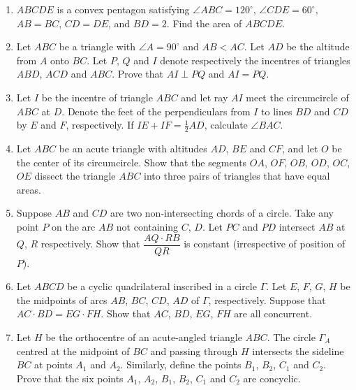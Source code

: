 \documentclass[12pt]{scrartcl}
\begin{document}
\begin{enumerate}[label=P\arabic*.,leftmargin=*,itemsep=0.6em]

\item $ABCDE$ is a convex pentagon satisfying $\angle ABC = 120^\circ$, $\angle CDE = 60^\circ$, $AB = BC$, $CD = DE$, and $BD = 2$. Find the area of $ABCDE$.

\item Let $ABC$ be a triangle with $\angle A = 90^\circ$ and $AB < AC$. Let $AD$ be the altitude from $A$ onto $BC$. Let $P$, $Q$ and $I$ denote respectively the incentres of triangles $ABD$, $ACD$ and $ABC$. Prove that $AI \perp PQ$ and $AI = PQ$.

\item Let $I$ be the incentre of triangle $ABC$ and let ray $AI$ meet the circumcircle of $ABC$ at $D$. Denote the feet of the perpendiculars from $I$ to lines $BD$ and $CD$ by $E$ and $F$, respectively. If $IE + IF = \tfrac12 AD$, calculate $\angle BAC$.

\item Let $ABC$ be an acute triangle with altitudes $AD$, $BE$ and $CF$, and let $O$ be the center of its circumcircle. Show that the segments $OA$, $OF$, $OB$, $OD$, $OC$, $OE$ dissect the triangle $ABC$ into three pairs of triangles that have equal areas.

\item Suppose $AB$ and $CD$ are two non-intersecting chords of a circle. Take any point $P$ on the arc $AB$ not containing $C$, $D$. Let $PC$ and $PD$ intersect $AB$ at $Q$, $R$ respectively. Show that $\dfrac{AQ \cdot RB}{QR}$ is constant (irrespective of position of $P$).

\item Let $ABCD$ be a cyclic quadrilateral inscribed in a circle $\Gamma$. Let $E$, $F$, $G$, $H$ be the midpoints of arcs $AB$, $BC$, $CD$, $AD$ of $\Gamma$, respectively. Suppose that $AC \cdot BD = EG \cdot FH$. Show that $AC$, $BD$, $EG$, $FH$ are all concurrent.

\item Let $H$ be the orthocentre of an acute-angled triangle $ABC$. The circle $\Gamma_A$ centred at the midpoint of $BC$ and passing through $H$ intersects the sideline $BC$ at points $A_1$ and $A_2$. Similarly, define the points $B_1$, $B_2$, $C_1$ and $C_2$. Prove that the six points $A_1$, $A_2$, $B_1$, $B_2$, $C_1$ and $C_2$ are concyclic.


\end{enumerate}
\end{document}
